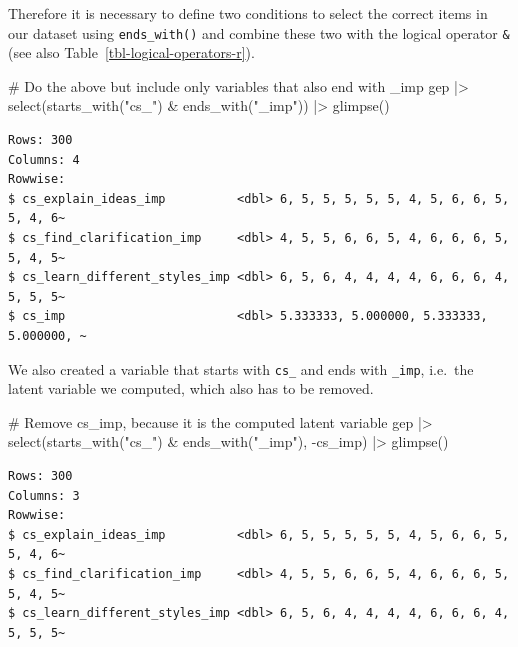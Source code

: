 \documentclass[
  letterpaper,
]{krantz}
\makeatletter
\newenvironment{Shaded}{\begin{snugshade}}{\end{snugshade}}
\newcommand{\CommentTok}[1]{\textcolor[rgb]{0.37,0.37,0.37}{#1}}
\newcommand{\FunctionTok}[1]{\textcolor[rgb]{0.28,0.35,0.67}{#1}}
\newcommand{\NormalTok}[1]{\textcolor[rgb]{0.00,0.23,0.31}{#1}}
\newcommand{\SpecialCharTok}[1]{\textcolor[rgb]{0.37,0.37,0.37}{#1}}
\newcommand{\StringTok}[1]{\textcolor[rgb]{0.13,0.47,0.30}{#1}}
\newenvironment{kframe}{%
\medskip{}
\setlength{\fboxsep}{.8em}
 \def\at@end@of@kframe{}%
 \ifinner\ifhmode%
  \def\at@end@of@kframe{\end{minipage}}%
  \begin{minipage}{\columnwidth}%
 \fi\fi%
 \def\FrameCommand##1{\hskip\@totalleftmargin \hskip-\fboxsep
 \colorbox{shadecolor}{##1}\hskip-\fboxsep
     \hskip-\linewidth \hskip-\@totalleftmargin \hskip\columnwidth}%
 \MakeFramed {\advance\hsize-\width
   \@totalleftmargin\z@ \linewidth\hsize
   \@setminipage}}%
 {\par\unskip\endMakeFramed%
 \at@end@of@kframe}
\renewenvironment{Shaded}{\begin{kframe}}{\end{kframe}}
\makeatother
\begin{document}
Therefore it is necessary to define two conditions to select the correct
items in our dataset using \texttt{ends\_with()} and combine these two
with the logical operator \texttt{\&} (see also
Table~\ref{tbl-logical-operators-r}).

\begin{Shaded}
\begin{Highlighting}[]
\CommentTok{\# Do the above but include only variables that also end with \textquotesingle{}\_imp\textquotesingle{}}
\NormalTok{gep }\SpecialCharTok{|\textgreater{}}
  \FunctionTok{select}\NormalTok{(}\FunctionTok{starts\_with}\NormalTok{(}\StringTok{"cs\_"}\NormalTok{) }\SpecialCharTok{\&} \FunctionTok{ends\_with}\NormalTok{(}\StringTok{"\_imp"}\NormalTok{)) }\SpecialCharTok{|\textgreater{}}
  \FunctionTok{glimpse}\NormalTok{()}
\end{Highlighting}
\end{Shaded}

\begin{verbatim}
Rows: 300
Columns: 4
Rowwise: 
$ cs_explain_ideas_imp          <dbl> 6, 5, 5, 5, 5, 5, 4, 5, 6, 6, 5, 5, 4, 6~
$ cs_find_clarification_imp     <dbl> 4, 5, 5, 6, 6, 5, 4, 6, 6, 6, 5, 5, 4, 5~
$ cs_learn_different_styles_imp <dbl> 6, 5, 6, 4, 4, 4, 4, 6, 6, 6, 4, 5, 5, 5~
$ cs_imp                        <dbl> 5.333333, 5.000000, 5.333333, 5.000000, ~
\end{verbatim}

We also created a variable that starts with \texttt{cs\_} and ends with
\texttt{\_imp}, i.e.~the latent variable we computed, which also has to
be removed.

\begin{Shaded}
\begin{Highlighting}[]
\CommentTok{\# Remove \textquotesingle{}cs\_imp\textquotesingle{}, because it is the computed latent variable}
\NormalTok{gep }\SpecialCharTok{|\textgreater{}}
  \FunctionTok{select}\NormalTok{(}\FunctionTok{starts\_with}\NormalTok{(}\StringTok{"cs\_"}\NormalTok{) }\SpecialCharTok{\&} \FunctionTok{ends\_with}\NormalTok{(}\StringTok{"\_imp"}\NormalTok{), }\SpecialCharTok{{-}}\NormalTok{cs\_imp) }\SpecialCharTok{|\textgreater{}}
  \FunctionTok{glimpse}\NormalTok{()}
\end{Highlighting}
\end{Shaded}

\begin{verbatim}
Rows: 300
Columns: 3
Rowwise: 
$ cs_explain_ideas_imp          <dbl> 6, 5, 5, 5, 5, 5, 4, 5, 6, 6, 5, 5, 4, 6~
$ cs_find_clarification_imp     <dbl> 4, 5, 5, 6, 6, 5, 4, 6, 6, 6, 5, 5, 4, 5~
$ cs_learn_different_styles_imp <dbl> 6, 5, 6, 4, 4, 4, 4, 6, 6, 6, 4, 5, 5, 5~
\end{verbatim}
\end{document}
